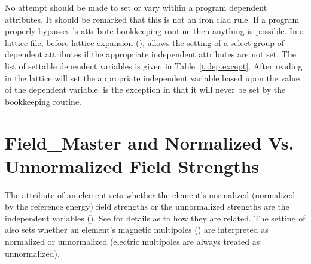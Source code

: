 No attempt should be made to set or vary within a program dependent attributes. It should be
remarked that this is not an iron clad rule.  If a program properly bypasses \bmad's attribute
bookkeeping routine then anything is possible. In a lattice file, before lattice expansion
(), \bmad allows the setting of a select group of dependent attributes if the
appropriate independent attributes are not set. The list of settable dependent variables is given in
Table~\ref{t:dep.except}.  After reading in the lattice \bmad will set the appropriate independent
variable based upon the value of the dependent variable.  is the exception in that it
will never be set by the bookkeeping routine.
\begin{table}[ht]
\caption {Dependent variables that can be set in a primary lattice file.}
\label{t:dep.except}
\end{table}

\section{Field_Master and Normalized Vs. Unnormalized Field Strengths}
\label{s:field.master}

The  attribute of an element sets whether the element's normalized (normalized by
the reference energy) field strengths or the unnormalized strengths are the independent variables
(). See  for details as to how they are related. The setting of
 also sets whether an element's magnetic multipoles () are
interpreted as normalized or unnormalized (electric multipoles are always treated as unnormalized).

